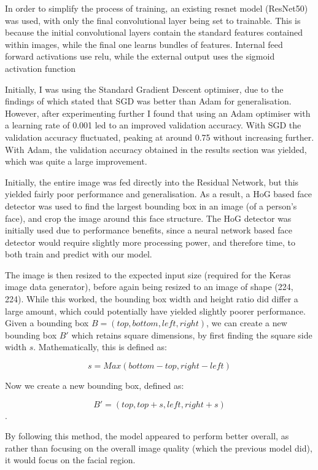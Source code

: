 \documentclass[10pt,a4paper]{article}
\begin{document}
        In order to simplify the process of training, an existing resnet model (ResNet50) was used, with only the final convolutional layer being
        set to trainable. This is because the initial convolutional layers contain the standard features contained within images, while the final one
        learns bundles of features. Internal feed forward activations use relu, while the external output uses the sigmoid activation function

        Initially, I was using the Standard Gradient Descent optimiser, due to the findings of \cite{SGDBetterThanAdamForImageClassification} which stated
        that SGD was better than Adam for generalisation. However, after experimenting further I found that using an Adam optimiser with a learning rate of 0.001
        led to an improved validation accuracy. With SGD the validation accuracy fluctuated, peaking at around 0.75 without increasing further. With Adam, the
        validation accuracy obtained in the results section was yielded, which was quite a large improvement.

        Initially, the entire image was fed directly into the Residual Network, but this yielded fairly poor performance and generalisation. As a result,
        a HoG based face detector was used to find the largest bounding box in an image (of a person's face), and crop the image around this face structure. The HoG detector was
        initially used due to performance benefits, since a neural network based face detector would require slightly more processing power, and therefore time, to both train and
        predict with our model.

        The image is then resized to the expected input size (required for the Keras image data generator), before again being resized to an image of shape (224, 224).
        While this worked, the bounding box width and height ratio did differ a large amount, which could potentially have yielded slightly poorer performance.
        Given a bounding box $B = (top, bottom, left, right)$, we can create a new bounding box $B'$ which retains square dimensions, by first finding the square
        side width $s$. Mathematically, this is defined as:

        $$s = Max(bottom - top, right - left)$$

        Now we create a new bounding box, defined as:

        $$B' = (top, top + s, left, right + s)$$.

        By following this method, the model appeared to perform better overall, as rather than focusing on the overall image quality (which the previous model did),
        it would focus on the facial region.
\end{document}
